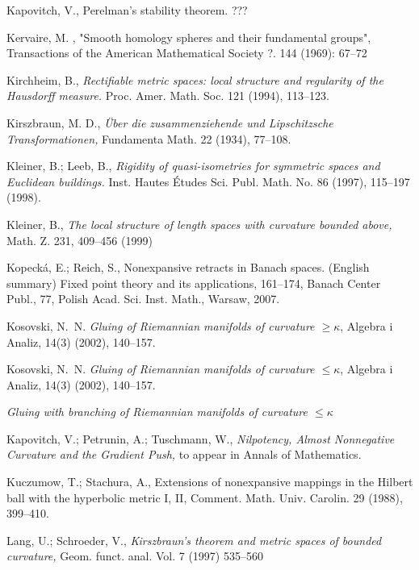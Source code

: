 \begin{thebibliography}{52}
 Kapovitch, V.,  Perelman's stability theorem. ???

 Kervaire, M. , "Smooth homology spheres and their fundamental groups", Transactions of the American Mathematical Society ?. 144 (1969): 67--72

 Kirchheim, B.,  \textit{Rectifiable metric spaces: local structure and regularity of the Hausdorff measure.} Proc. Amer. Math. Soc. 121 (1994), 113--123.

 Kirszbraun, M. D., \textit{\"Uber die zusammenziehende und Lipschitzsche Transformationen,} Fundamenta Math. 22 (1934), 77--108.

  Kleiner, B.; Leeb, B., \textit{Rigidity of quasi-isometries for symmetric spaces and Euclidean buildings.} Inst. Hautes \'Etudes Sci. Publ. Math. No. 86 (1997), 115--197 (1998).

 Kleiner, B.,  \textit{The local structure of length spaces
with curvature bounded above,} Math. Z. 231, 409--456 (1999)

Kopeck\'a, E.; Reich, S.,
Nonexpansive retracts in Banach spaces. (English summary) Fixed point theory and its applications, 161--174, 
Banach Center Publ., 77, Polish Acad. Sci. Inst. Math., Warsaw, 2007. 

Kosovski, N.~N. 
\textit{Gluing of Riemannian manifolds of curvature $\geq \kappa$}, Algebra i Analiz, 14(3) (2002), 140--157.

Kosovski, N.~N. 
\textit{Gluing of Riemannian manifolds of curvature $\leq \kappa$}, Algebra i Analiz, 14(3) (2002), 140--157.

\textit{Gluing with branching of {R}iemannian manifolds of curvature $\leq \kappa$}

 Kapovitch, V.; Petrunin, A.; Tuschmann, W.,  \textit{Nilpotency, Almost Nonnegative Curvature and the Gradient Push,} to appear in Annals of Mathematics.

 Kuczumow, T.; Stachura, A., Extensions of nonexpansive mappings in
the Hilbert ball with the hyperbolic metric I, II, Comment. Math. Univ.
Carolin. 29 (1988), 399--410.

  Lang, U.; Schroeder, V., \textit{Kirszbraun's theorem and metric spaces of bounded curvature,} Geom. funct. anal.
Vol. 7 (1997) 535--560


\end{thebibliography}
